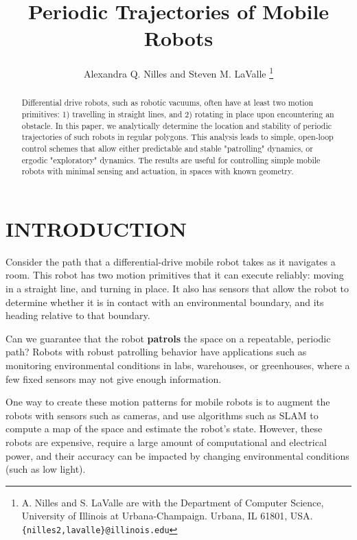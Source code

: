 \documentclass[letterpaper, 10 pt, conference]{ieeeconf}  %
\title{\LARGE \bf
Periodic Trajectories of Mobile Robots}
\author{Alexandra Q. Nilles and Steven M. LaValle%
\thanks{A. Nilles and S. LaValle are with the Department of Computer Science, 
University of Illinois at Urbana-Champaign. Urbana, IL 61801, USA. 
        {\tt\small \{nilles2,lavalle\}@illinois.edu}}%
}
\begin{document}
\maketitle
\thispagestyle{empty}
\pagestyle{empty}


\begin{abstract}

Differential drive robots, such as robotic vacuums, often have at least two motion
primitives: 1) travelling in straight lines, and 2) rotating in place upon
encountering an obstacle. 
In this paper, we analytically determine the location and stability
of periodic trajectories of such robots in regular polygons. This analysis leads
to simple, open-loop control schemes
that allow either predictable and stable "patrolling" dynamics, or ergodic
"exploratory" dynamics. The results are useful for controlling simple mobile
robots with minimal sensing and actuation, in spaces with known geometry.

\end{abstract}


\section{INTRODUCTION}

Consider the path that a differential-drive mobile robot takes as it navigates a room.
This robot has two motion primitives that it can execute reliably: moving in a straight
line, and turning in place. It also has sensors that allow the robot to
determine whether it is in contact with an environmental boundary, and its
heading relative to that boundary.

Can we guarantee that the robot \textbf{patrols} the space on a repeatable, periodic path? Robots with
robust patrolling behavior have applications such as
monitoring environmental conditions in labs, warehouses, or greenhouses, where
a few fixed sensors may not give enough information.


One way to create these motion patterns for mobile robots is to augment the
robots with sensors such as cameras, and use algorithms such as SLAM to compute
a map of the space and estimate the robot's state. However, these robots are
expensive, require a large amount of computational and electrical power, and
their accuracy can be impacted by changing environmental conditions (such as low
light).
\end{document}

